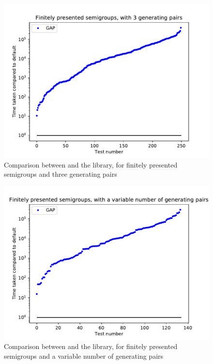\begin{figure}[p]
  \centering
  \includegraphics[width=\textwidth]{pics/ch-pairs/bench-fp-3p-gap}
  \caption[Benchmark: \GAP{}/\libsemigroups{}, finitely presented, 3 pairs]
  {Comparison between \libsemigroups{} and the \GAP{} library, for
    finitely presented semigroups and three generating pairs}
  \label{fig:bench-fp-3p-gap}
\end{figure}

\begin{figure}[p]
  \centering
  \includegraphics[width=\textwidth]{pics/ch-pairs/bench-fp-vp-gap}
  \caption[Benchmark: \GAP{}/\libsemigroups{}, finitely presented, $n$ pairs]
  {Comparison between \libsemigroups{} and the \GAP{} library, for
    finitely presented semigroups and a variable number of generating pairs}
  \label{fig:bench-fp-vp-gap}
\end{figure}

